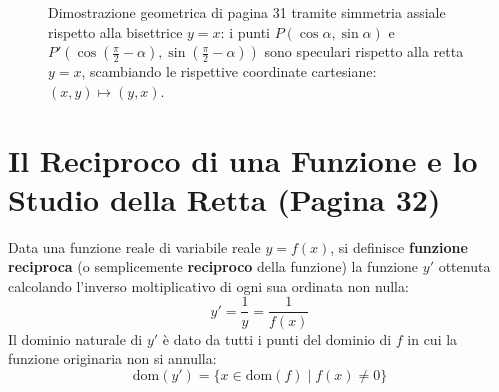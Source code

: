 \documentclass[11pt,a4paper,oneside]{report}
\begin{document}
\begin{figure}[htbp]
\caption{Dimostrazione geometrica di pagina 31 tramite simmetria assiale rispetto alla bisettrice $y = x$: i punti $P(\cos\alpha, \sin\alpha)$ e $P'(\cos(\frac{\pi}{2}-\alpha), \sin(\frac{\pi}{2}-\alpha))$ sono speculari rispetto alla retta $y = x$, scambiando le rispettive coordinate cartesiane: $(x, y) \mapsto (y, x)$.}
\label{fig:simmetria_bisettrice_complementari}
\end{figure}

\newpage

\section{Il Reciproco di una Funzione e lo Studio della Retta (Pagina 32)}

\begin{definizione}
Data una funzione reale di variabile reale $y = f(x)$, si definisce \textbf{funzione reciproca} (o semplicemente \textbf{reciproco} della funzione) la funzione $y'$ ottenuta calcolando l'inverso moltiplicativo di ogni sua ordinata non nulla:
\begin{equation}
    y' = \frac{1}{y} = \frac{1}{f(x)}
\end{equation}
Il dominio naturale di $y'$ \`e dato da tutti i punti del dominio di $f$ in cui la funzione originaria non si annulla:
\begin{equation}
    \mathrm{dom}(y') = \{x \in \mathrm{dom}(f) \mid f(x) \neq 0\}
\end{equation}
\end{definizione}
\end{document}
